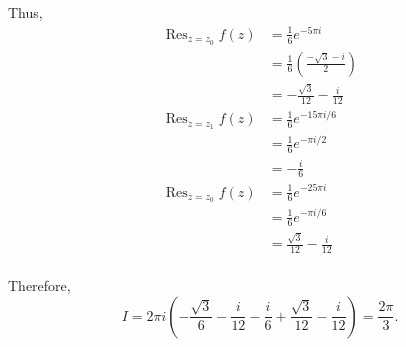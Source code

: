 \documentclass[12pt]{exam}
\DeclareMathOperator*{\Res}{Res}
\begin{document}
\begin{questions}
\begin{parts}
\begin{solution}
    Thus,
    \begin{align*}
        \Res_{z=z_0}f(z) &= \frac16{e^{-5\pi i}}\\
        &= \frac16 \left(\frac{-\sqrt3 - i}2\right)\\
        &= -\frac{\sqrt3}{12} - \frac{i}{12}\\
        \Res_{z=z_1}f(z) &= \frac16e^{-15\pi i/6}\\
        &=\frac16e^{-\pi i/2}\\
        &= -\frac i6\\
        \Res_{z=z_0}f(z) &= \frac16e^{-25\pi i}\\
        &= \frac16e^{-\pi i/6}\\
        &= \frac{\sqrt3}{12} - \frac i{12}\\
    \end{align*}

    Therefore,
    \[
        I = 2\pi i\left(-\frac{\sqrt3}6 - \frac{i}{12} - \frac i6  + \frac{\sqrt3}{12} - \frac i{12}\right) = \frac{2\pi}3.
    \]
\end{solution}



\end{parts}
\end{questions}
\end{document}
